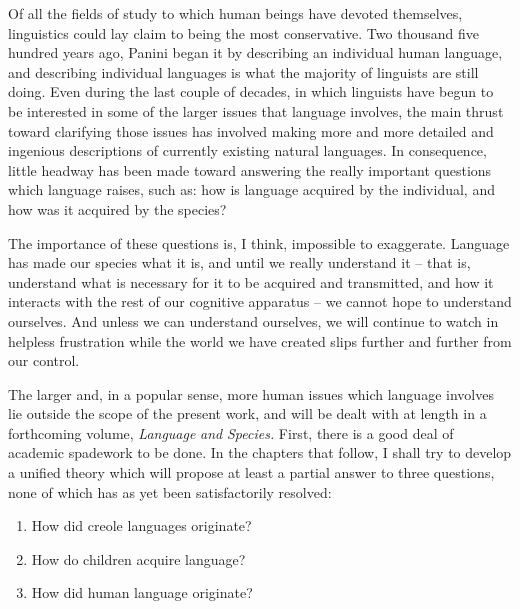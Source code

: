 
Of all the fields of study to which human beings have devoted themselves, linguistics could lay claim to being the most conservative. Two thousand five hundred years ago, Panini began it by describing an individual human language, and describing individual languages is what the majority of linguists are still doing. Even during the last couple of decades, in which linguists have begun to be interested in some of the larger issues that language involves, the main thrust toward clarifying those issues has involved making more and more detailed and ingenious descriptions of currently existing natural languages. In consequence, little headway has been made toward answering the really important questions which language raises, such as: how is language acquired by the individual, and how was it acquired by the species?

The importance of these questions is, I think, impossible to exaggerate. Language has made our species what it is, and until we really understand it -- that is, understand what is necessary for it to be acquired and transmitted, and how it interacts with the rest of our cognitive apparatus -- we cannot hope to understand ourselves. And unless we can understand ourselves, we will continue to watch in helpless frustration while the world we have created slips further and further from our control.

The larger and, in a popular sense, more human issues which language involves lie outside the scope of the present work, and will be dealt with at length in a forthcoming volume, \textit{Language} \textit{and} \textit{Species.} First, there is a good deal of academic spadework to be done. In the chapters that follow, I shall try to develop a unified theory which will propose at least a partial answer to three questions, none of which has as yet been satisfactorily resolved:

\begin{enumerate}
\item How did creole languages originate?
\item How do children acquire language?
\item How did human language originate?
\end{enumerate} 

